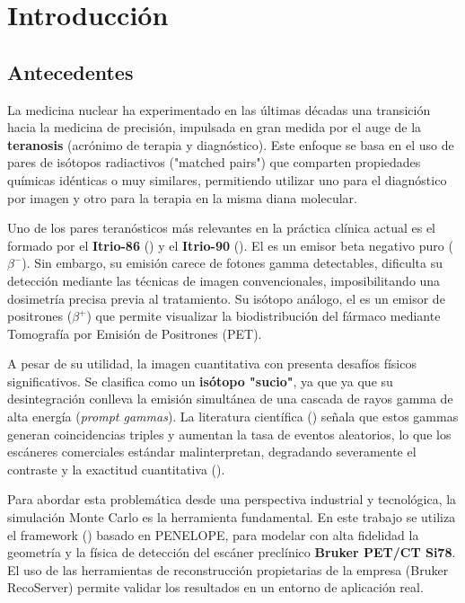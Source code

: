 \chapter{Introducción}

\label{cap:introduccion}


\section{Antecedentes}

La medicina nuclear ha experimentado en las últimas décadas una transición hacia la medicina de precisión, impulsada en gran medida
por el auge de la \textbf{teranosis} (acrónimo de terapia y diagnóstico). Este enfoque se basa en el uso de pares de isótopos radiactivos
("matched pairs") que comparten propiedades químicas idénticas o muy similares, permitiendo utilizar uno para el diagnóstico por
imagen y otro para la terapia en la misma diana molecular.

Uno de los pares teranósticos más relevantes en la práctica clínica actual es el formado por el \textbf{Itrio-86} (\yochoseis) y el
\textbf{Itrio-90} (\ynuevecero). El \ynuevecero es un emisor beta negativo puro ($\beta^-$). Sin embargo, su emisión carece de
fotones gamma detectables, dificulta su detección mediante las técnicas de imagen convencionales, imposibilitando una dosimetría
precisa previa al tratamiento. Su isótopo análogo, el \yochoseis es un emisor de positrones ($\beta^+$) que permite visualizar la
biodistribución del fármaco mediante Tomografía por Emisión de Positrones (PET).

A pesar de su utilidad, la imagen cuantitativa con \yochoseis presenta desafíos físicos significativos. Se clasifica como un
\textbf{isótopo "sucio"}, ya que ya que su desintegración conlleva la emisión simultánea de una cascada de rayos gamma de alta
energía (\textit{prompt gammas}). La literatura científica (\cite{Lubberink2011,Conti2016}) señala que estos gammas generan
coincidencias triples y aumentan la tasa de eventos aleatorios, lo que los escáneres comerciales estándar malinterpretan,
degradando severamente el contraste y la exactitud cuantitativa (\cite{Buchholz2003}).

Para abordar esta problemática desde una perspectiva industrial y tecnológica, la simulación Monte Carlo es la herramienta
fundamental. En este trabajo se utiliza el framework \textbf{\penred} (\cite{Gimnez-Alventosa2021})
basado en PENELOPE, para modelar con alta fidelidad la geometría y la física de detección del escáner preclínico
\textbf{Bruker PET/CT Si78}. El uso de las herramientas de reconstrucción propietarias de la empresa (Bruker RecoServer)
permite validar los resultados en un entorno de aplicación real.


